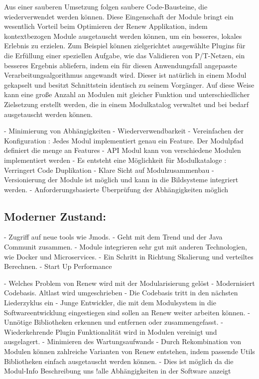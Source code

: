 Aus einer sauberen Umsetzung folgen saubere Code-Bausteine, die wiederverwendet werden können. Diese Eingenschaft der Module bringt ein wesentlich Vorteil beim Optimieren der Renew Applikation, indem kontextbezogen Module ausgetauscht werden können, um ein besseres, lokales Erlebnis zu erzielen. Zum Beispiel können zielgerichtet ausgewählte Plugins für die Erfüllung einer speziellen Aufgabe, wie das Validieren von P/T-Netzen, ein besseres Ergebnis abliefern, indem ein für diesen Anwendungsfall angepasste Verarbeitungsalgorithmus angewandt wird. Dieser ist natürlich in einem Modul gekapselt und besitzt Schnittstein identisch zu seinem Vorgänger. Auf diese Weise kann eine große Anzahl an Modulen mit gleicher Funktion und unterschiedlicher Zielsetzung erstellt werden, die in einem Modulkatalog verwaltet und bei bedarf ausgetauscht werden können.

 \newpage




	- Minimierung von Abhängigkeiten 
	- Wiederverwendbarkeit 
	- Vereinfachen der Konfiguration : Jedes Modul implementiert genau ein Feature. Der Modulpfad definiert die menge an Features 
	- API Modul kann von verschiedene Modulen implementiert werden
	- Es entsteht eine Möglichkeit für Modulkataloge : Verringert Code Duplikation
	- Klare Sicht auf Modulzusammenbau  
	- Versionierung der Module ist möglich und kann in die Bildsysteme integriert werden. 
	- Anforderungsbasierte Überprüfung der Abhängigkeiten möglich 

\subsection{Moderner Zustand:} \label{sub:moderner_zustand_}
	- Zugriff auf neue tools wie Jmods.
	- Geht mit dem Trend und der Java Communit zusammen. 
	- Module integrieren sehr gut mit anderen Technologien, wie Docker und Microservices.
	- Ein Schritt in Richtung Skalierung und verteiltes Berechnen. 
	- Start Up Performance 



	- Welches Problem von Renew wird mit der Modularisierung gelöst 
		- Modernisiert Codebasis. Altlast wird umgeschrieben
		- Die Codebasis tritt in den nächsten Liederzyklus ein
		- Junge Entwickler, die mit dem Modulsystem in die Softwareentwicklung eingestiegen sind sollen an Renew weiter arbeiten können. 
		- Unnötige Bibliotheken erkennen und entfernen oder zusammengefasst.
		- Wiederkehrende Plugin Funktionalität wird in Modulen vereinigt und ausgelagert.
		- Minimieren des Wartungsaufwands 
		- Durch Rekombination von Modulen können zahlreiche Varianten von Renew entstehen, indem passende Utils Bibliotheken einfach ausgetauscht werden können. 
		-  Dies ist möglich da die Modul-Info Beschreibung uns !alle Abhängigkeiten in der Software anzeigt 




